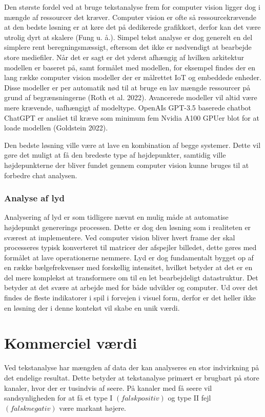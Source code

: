 \documentclass{article}
\begin{document}
Den største fordel ved at bruge tekstanalyse frem for computer vision ligger dog i mængde af ressourcer det kræver. Computer vision er ofte så ressourcekrævende at den bedste løsning er at køre det på dedikerede grafikkort, derfor kan det være utrolig dyrt at skalere (Fung u. å.). Simpel tekst analyse er dog generelt en del simplere rent beregningsmæssigt, eftersom det ikke er nødvendigt at bearbejde store mediefiler. Når det er sagt er det yderst afhængig af hvilken arkitektur modellen er baseret på, samt formålet med modellen, for eksempel findes der en lang række computer vision modeller der er målrettet IoT og embeddede enheder. Disse modeller er per automatik nød til at bruge en lav mængde ressourcer på grund af begrænsningerne (Roth et al. 2022). Avancerede modeller vil altid være mere krævende, uafhængigt af modeltype. OpenAIs GPT-3.5 baserede chatbot ChatGPT er anslået til kræve som minimum fem Nvidia A100 GPUer blot for at loade modellen (Goldstein 2022).

Den bedste løsning ville være at lave en kombination af begge systemer. Dette vil gøre det muligt at få den bredeste type af højdepunkter, samtidig ville højdepunkterne der bliver fundet gennem computer vision kunne bruges til at forbedre chat analysen.

\subsubsection{Analyse af lyd }
Analysering af lyd er som tidligere nævnt en mulig måde at automatise højdepunkt genererings processen. Dette er dog den løsning som i realiteten er sværest at implementere. Ved computer vision bliver hvert frame der skal processeres typisk konverteret til matricer der afspejler billedet, dette gøres med formålet at lave operationerne nemmere. Lyd er dog fundamentalt bygget op af en række bælgefrekvenser med forskellig intensitet, hvilket betyder at det er en del mere komplekst at transformere om til en let bearbejdeligt datastruktur. Det betyder at det svære at arbejde med for både udvikler og computer. Ud over det findes de fleste indikatorer i spil i forvejen i visuel form, derfor er det heller ikke en løsning der i denne kontekst vil skabe en unik værdi.


\section{Kommerciel værdi }
Ved tekstanalyse har mængden af data der kan analyseres en stor indvirkning på det endelige resultat. Dette betyder at tekstanalyse primært er brugbart på store kanaler, hvor der er tusindvis af seere. På kanaler med få seere vil sandsynligheden for at få et type I \((falsk positiv)\) og type II fejl \((falsk negativ)\) være markant højere.
\end{document}
